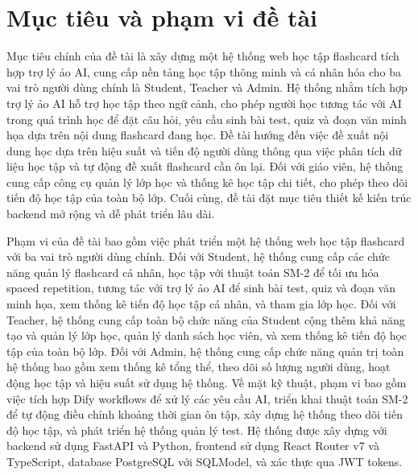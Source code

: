 \documentclass[../DoAn.tex]{subfiles}
\begin{document}
\section{Mục tiêu và phạm vi đề tài}
\label{section:1.3}
Mục tiêu chính của đề tài là xây dựng một hệ thống web học tập flashcard tích hợp trợ lý ảo AI, cung cấp nền tảng học tập thông minh và cá nhân hóa cho ba vai trò người dùng chính là Student, Teacher và Admin. Hệ thống nhằm tích hợp trợ lý ảo AI hỗ trợ học tập theo ngữ cảnh, cho phép người học tương tác với AI trong quá trình học để đặt câu hỏi, yêu cầu sinh bài test, quiz và đoạn văn minh họa dựa trên nội dung flashcard đang học. Đề tài hướng đến việc đề xuất nội dung học dựa trên hiệu suất và tiến độ người dùng thông qua việc phân tích dữ liệu học tập và tự động đề xuất flashcard cần ôn lại. Đối với giáo viên, hệ thống cung cấp công cụ quản lý lớp học và thống kê học tập chi tiết, cho phép theo dõi tiến độ học tập của toàn bộ lớp. Cuối cùng, đề tài đặt mục tiêu thiết kế kiến trúc backend mở rộng và dễ phát triển lâu dài.

Phạm vi của đề tài bao gồm việc phát triển một hệ thống web học tập flashcard với ba vai trò người dùng chính. Đối với Student, hệ thống cung cấp các chức năng quản lý flashcard cá nhân, học tập với thuật toán SM-2 để tối ưu hóa spaced repetition, tương tác với trợ lý ảo AI để sinh bài test, quiz và đoạn văn minh họa, xem thống kê tiến độ học tập cá nhân, và tham gia lớp học. Đối với Teacher, hệ thống cung cấp toàn bộ chức năng của Student cộng thêm khả năng tạo và quản lý lớp học, quản lý danh sách học viên, và xem thống kê tiến độ học tập của toàn bộ lớp. Đối với Admin, hệ thống cung cấp chức năng quản trị toàn hệ thống bao gồm xem thống kê tổng thể, theo dõi số lượng người dùng, hoạt động học tập và hiệu suất sử dụng hệ thống. Về mặt kỹ thuật, phạm vi bao gồm việc tích hợp Dify workflows để xử lý các yêu cầu AI, triển khai thuật toán SM-2 để tự động điều chỉnh khoảng thời gian ôn tập, xây dựng hệ thống theo dõi tiến độ học tập, và phát triển hệ thống quản lý test. Hệ thống được xây dựng với backend sử dụng FastAPI và Python, frontend sử dụng React Router v7 và TypeScript, database PostgreSQL với SQLModel, và xác thực qua JWT tokens.
\end{document}
